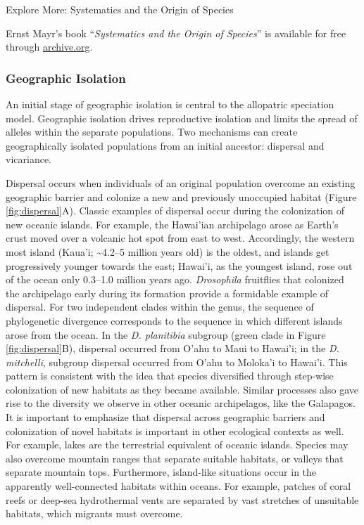 \documentclass[
]{book}
\begin{document}
Explore More: Systematics and the Origin of Species

Ernst Mayr's book ``\emph{Systematics and the Origin of Species}'' is available for free through \href{https://archive.org/details/in.ernet.dli.2015.20284}{archive.org}.

\hypertarget{geographic-isolation}{%
\subsubsection*{Geographic Isolation}\label{geographic-isolation}}

An initial stage of geographic isolation is central to the allopatric speciation model. Geographic isolation drives reproductive isolation and limits the spread of alleles within the separate populations. Two mechanisms can create geographically isolated populations from an initial ancestor: dispersal and vicariance.

Dispersal occurs when individuals of an original population overcome an existing geographic barrier and colonize a new and previously unoccupied habitat (Figure \ref{fig:dispersal}A). Classic examples of dispersal occur during the colonization of new oceanic islands. For example, the Hawai'ian archipelago arose as Earth's crust moved over a volcanic hot spot from east to west. Accordingly, the western most island (Kaua'i; \textasciitilde4.2--5 million years old) is the oldest, and islands get progressively younger towards the east; Hawai'i, as the youngest island, rose out of the ocean only 0.3--1.0 million years ago. \emph{Drosophila} fruitflies that colonized the archipelago early during its formation provide a formidable example of dispersal. For two independent clades within the genus, the sequence of phylogenetic divergence corresponds to the sequence in which different islands arose from the ocean. In the \emph{D. planitibia} subgroup (green clade in Figure \ref{fig:dispersal}B), dispersal occurred from O'ahu to Maui to Hawai'i; in the \emph{D.} \emph{mitchelli}, subgroup dispersal occurred from O'ahu to Moloka'i to Hawai'i. This pattern is consistent with the idea that species diversified through step-wise colonization of new habitats as they became available. Similar processes also gave rise to the diversity we observe in other oceanic archipelagos, like the Galapagos. It is important to emphasize that dispersal across geographic barriers and colonization of novel habitats is important in other ecological contexts as well. For example, lakes are the terrestrial equivalent of oceanic islands. Species may also overcome mountain ranges that separate suitable habitats, or valleys that separate mountain tops. Furthermore, island-like situations occur in the apparently well-connected habitats within oceans. For example, patches of coral reefs or deep-sea hydrothermal vents are separated by vast stretches of unsuitable habitats, which migrants must overcome.
\end{document}

